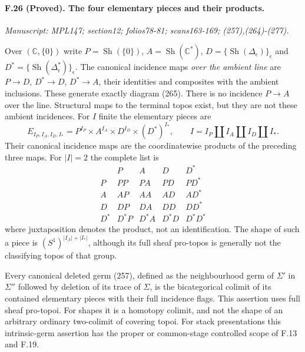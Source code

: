 \paragraph{F.26 (Proved). The four elementary pieces and their products.}
\textit{Manuscript: MPL147; section12; folios78-81; scans163-169; (257),(264)-(277).}

Over $(\mathbb C,\{0\})$ write
$P=\operatorname{Sh}(\{0\})$, $A=\operatorname{Sh}(\mathbb C^*)$,
$D=\{\operatorname{Sh}(\Delta_\epsilon)\}_\epsilon$ and
$D^*=\{\operatorname{Sh}(\Delta_\epsilon^*)\}_\epsilon$.
The canonical incidence maps \emph{over the ambient line} are
$P\to D$, $D^*\to D$, $D^*\to A$, their identities and composites
with the ambient inclusions. These generate exactly diagram (265).
There is no incidence $P\to A$ over the line. Structural maps to
the terminal topos exist, but they are not these ambient incidences.
For $I$ finite the elementary pieces are
\[
 E_{I_P,I_A,I_D,I_*}
 =P^{I_P}\times A^{I_A}\times D^{I_D}\times(D^*)^{I_*},
 \qquad I=I_P\amalg I_A\amalg I_D\amalg I_*.
\]
Their canonical incidence maps are the coordinatewise products of
the preceding three maps. For $|I|=2$ the complete list is
\[
\begin{array}{c|cccc}
 &P&A&D&D^*\\ \hline
 P&P P&P A&P D&P D^*\\
 A&A P&A A&A D&A D^*\\
 D&D P&D A&D D&D D^*\\
 D^*&D^*P&D^*A&D^*D&D^*D^*
\end{array}
\]
where juxtaposition denotes the product, not an identification.
The shape of such a piece is $(S^1)^{|I_A|+|I_*|}$, although its
full sheaf pro-topos is generally not the classifying topos of that
group.

Every canonical deleted germ (257), defined as the neighbourhood
germ of $\Sigma'$ in $\Sigma''$ followed by deletion of its trace
of $\Sigma$, is the bicategorical colimit of its contained elementary
pieces with their full incidence flags. This assertion uses full
sheaf pro-topoi. For shapes it is a homotopy colimit, and not the
shape of an arbitrary ordinary two-colimit of covering topoi.
For stack presentations this intrinsic-germ assertion has the proper
or common-stage controlled scope of F.13 and F.19.

